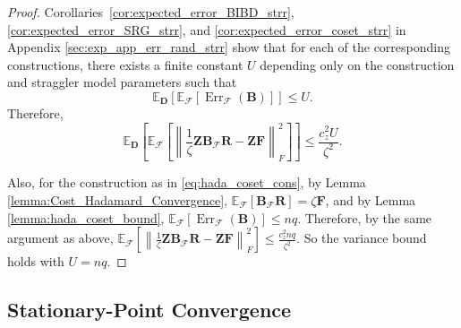 \documentclass[journal,draftcls,onecolumn]{IEEEtran}
\theoremstyle{mystyle}
\begin{document}
\begin{proof}
Corollaries~\ref{cor:expected_error_BIBD_strr}, \ref{cor:expected_error_SRG_strr}, and \ref{cor:expected_error_coset_strr} in Appendix \ref{sec:exp_app_err_rand_strr} show that for each of the corresponding
constructions, there exists a finite constant $U$ depending only on
the construction and straggler model parameters such that
\begin{equation}
\mathbb E_{\mathbf D}
\left[
\mathbb E_{\mathcal F}
\left[
\operatorname{Err}_{\mathcal F}(\mathbf B)
\right]
\right]
\leq U.
\end{equation}
Therefore,
\begin{equation}
\mathbb E_{\mathbf D}
\left[
\mathbb E_{\mathcal F}
\left[
\left\|
\frac{1}{\zeta}
\mathbf Z\mathbf B_{\mathcal F}\mathbf R
-
\mathbf Z\mathbf F
\right\|_F^2
\right]
\right]
\leq
\frac{c_z^2U}{\zeta^2}.
\end{equation}

Also, for the construction as in \eqref{eq:hada_coset_cons}, by Lemma \ref{lemma:Cost_Hadamard_Convergence}, $\mathbb E_{\mathcal F}
\left[
\mathbf B_{\mathcal F}\mathbf R
\right]
=
\zeta\mathbf F$, and by Lemma \ref{lemma:hada_coset_bound}, $
\mathbb E_{\mathcal F}
\left[
\operatorname{Err}_{\mathcal F}(\mathbf B)
\right] 
\leq  nq$. Therefore, by the same argument as above, $\mathbb E_{\mathcal F}
\left[
\left\|
\frac{1}{\zeta}
\mathbf Z\mathbf B_{\mathcal F}\mathbf R
-
\mathbf Z\mathbf F
\right\|_F^2
\right]
\leq
\frac{c_z^2 nq}{\zeta^2}.$ So the variance bound holds with $U = nq$.

\end{proof}



\subsection{Stationary-Point Convergence}
\end{document}
